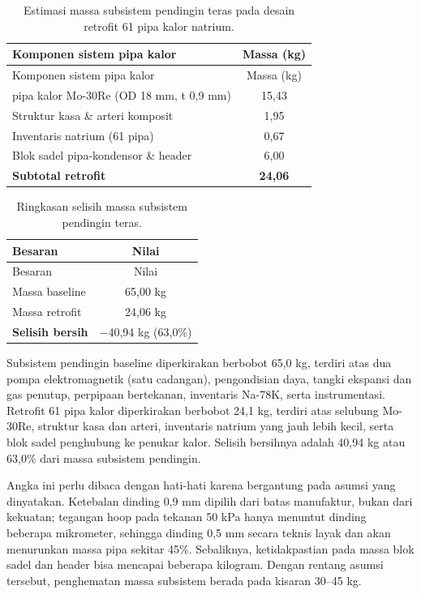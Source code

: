 \documentclass[
  indonesian,
  12pt,
  a4paper,
]{report}
\begin{document}
\begin{longtable}[]{@{}lc@{}}
\caption{Estimasi massa subsistem pendingin teras pada desain retrofit
61 pipa kalor natrium.}\label{tbl-massa-retr}\tabularnewline
\toprule\noalign{}
Komponen sistem pipa kalor & Massa (kg) \\
\midrule\noalign{}
\endfirsthead
\toprule\noalign{}
Komponen sistem pipa kalor & Massa (kg) \\
\midrule\noalign{}
\endhead
\bottomrule\noalign{}
\endlastfoot
61 pipa kalor Mo-30Re (OD 18 mm, t 0,9 mm) & 15,43 \\
Struktur kasa \& arteri komposit & 1,95 \\
Inventaris natrium (61 pipa) & 0,67 \\
Blok sadel pipa-kondensor \& header & 6,00 \\
\textbf{Subtotal retrofit} & \textbf{24,06} \\
\end{longtable}

\begin{longtable}[]{@{}lc@{}}
\caption{Ringkasan selisih massa subsistem pendingin
teras.}\label{tbl-massa}\tabularnewline
\toprule\noalign{}
Besaran & Nilai \\
\midrule\noalign{}
\endfirsthead
\toprule\noalign{}
Besaran & Nilai \\
\midrule\noalign{}
\endhead
\bottomrule\noalign{}
\endlastfoot
Massa baseline & 65,00 kg \\
Massa retrofit & 24,06 kg \\
\textbf{Selisih bersih} & \textbf{\(-\)}40,94 kg (63,0\%) \\
\end{longtable}

Subsistem pendingin baseline diperkirakan berbobot 65,0 kg, terdiri atas
dua pompa elektromagnetik (satu cadangan), pengondisian daya, tangki
ekspansi dan gas penutup, perpipaan bertekanan, inventaris Na-78K, serta
instrumentasi. Retrofit 61 pipa kalor diperkirakan berbobot 24,1 kg,
terdiri atas selubung Mo-30Re, struktur kasa dan arteri, inventaris
natrium yang jauh lebih kecil, serta blok sadel penghubung ke penukar
kalor. Selisih bersihnya adalah 40,94 kg atau 63,0\% dari massa
subsistem pendingin.

Angka ini perlu dibaca dengan hati-hati karena bergantung pada asumsi
yang dinyatakan. Ketebalan dinding 0,9 mm dipilih dari batas manufaktur,
bukan dari kekuatan; tegangan hoop pada tekanan 50 kPa hanya menuntut
dinding beberapa mikrometer, sehingga dinding 0,5 mm secara teknis layak
dan akan menurunkan massa pipa sekitar 45\%. Sebaliknya, ketidakpastian
pada massa blok sadel dan header bisa mencapai beberapa kilogram. Dengan
rentang asumsi tersebut, penghematan massa subsistem berada pada kisaran
30--45 kg.
\end{document}
